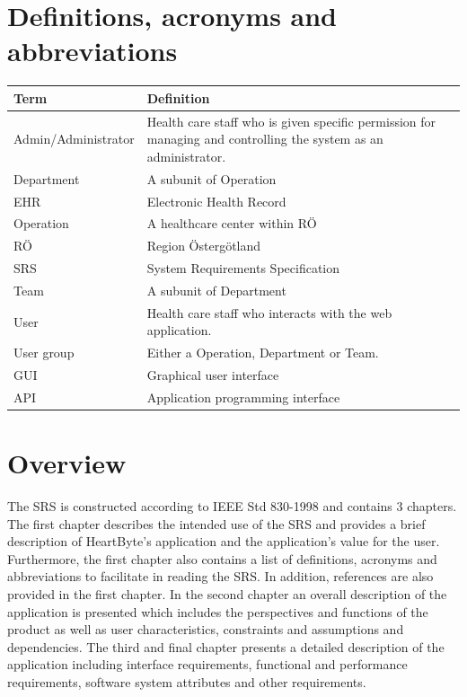 \documentclass{scrreprt}
\begin{document}
\section{Definitions, acronyms and abbreviations}
\label{section:def}
\begin{center}
\begin{tabularx}{\linewidth}{| l | X |}
 \hline
 \textbf{Term} & \textbf{Definition} \\ 
 \hline
   Admin/Administrator & Health care staff who is given specific permission for managing and controlling the system as an administrator.  \\ 
  \hline
    Department & A subunit of Operation \\
  \hline
   EHR & Electronic Health Record \\ 
   \hline
      Operation & A healthcare center within RÖ \\ 
  \hline
    RÖ  & Region Östergötland  \\ 
  \hline
    SRS & System Requirements Specification \\
  \hline
    Team & A subunit of Department \\ 
  \hline
  User  & Health care staff who interacts with the web application.  \\
  \hline
  User group & Either a Operation, Department or Team. \\
  \hline 
  GUI & Graphical user interface \\
  \hline 
  API & Application programming interface \\
  \hline
\end{tabularx}
\end{center}




\section{Overview}
The SRS is constructed according to IEEE Std 830-1998 \cite{ieeesrsrec} and contains 3 chapters. The first chapter describes the intended use of the SRS and provides a brief description of HeartByte’s application and the application’s value for the user. Furthermore, the first chapter also contains a list of definitions, acronyms and abbreviations to facilitate in reading the SRS. In addition, references are also provided in the first chapter. In the second chapter an overall description of the application is presented which includes the perspectives and functions of the product as well as user characteristics, constraints and assumptions and dependencies. The third and final chapter presents a detailed description of the application including interface requirements, functional and performance requirements, software system attributes and other requirements. 
\end{document}
